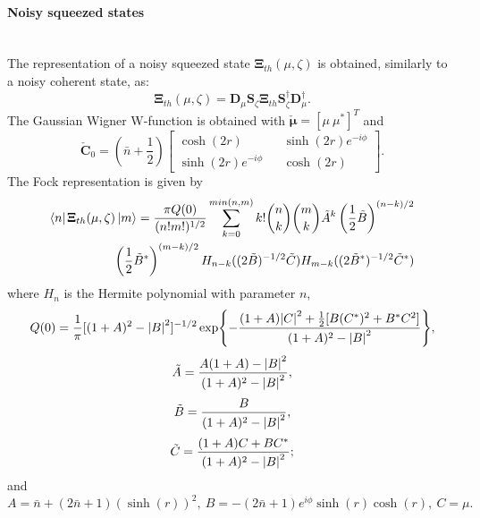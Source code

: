     \paragraph{Noisy squeezed states}\mbox{} \\
    The representation of a noisy squeezed state $\pmb{\Xi}_{th}(\mu,\zeta)$ is obtained,
    similarly to a noisy coherent state, as:
    \begin{equation}
        \pmb{\Xi}_{th}(\mu,\zeta)=\pmb{D}_\mu\pmb{S}_\zeta\pmb{\Xi}_{th}
        \pmb{S}_\zeta^\dagger\pmb{D}_\mu^\dagger.
    \end{equation}
    The Gaussian Wigner W-function is obtained with $\check{\pmb{\mu}}=[\mu\ \mu^*]^T$ and
    \begin{equation*}
        \check{\pmb{C}}_0=\left(\bar{n}+\frac{1}{2}\right)
        \begin{bmatrix}
            \cosh(2r) && \sinh(2r)e^{-i\phi}\\
            \sinh(2r)e^{-i\phi} && \cosh(2r)
        \end{bmatrix}.
    \end{equation*}
    The Fock representation is given by \cite{MarMar_1993}
    \begin{equation}\begin{split}
        \bra{n}\pmb{\Xi}_{th}(\mu,\zeta)\ket{m}=\frac{\pi Q(0)}{(n!m!)^{1/2}}
        \sum_{k=0}^{min(n,m)} k! \binom{n}{k}\binom{m}{k} \tilde{A}^k\left(\frac{1}{2}
        \tilde{B}\right)^{(n-k)/2}\\ \left(\frac{1}{2}\tilde{B}^*\right)^{(m-k)/2}
        H_{n-k}((2\tilde{B})^{-1/2}\tilde{C}) H_{m-k}((2\tilde{B}^*)^{-1/2}\tilde{C}^*) 
        \label{FR_NSS}
    \end{split}\end{equation}
    where $H_n$ is the Hermite polynomial with parameter $n$,
    \begin{equation*}
        Q(0)=\frac{1}{\pi}[(1+A)^2-\absolutevalue{B}^2]^{-1/2}\exp{-\frac{(1+A)\absolutevalue{C}^2
        +\frac{1}{2}[B(C^*)^2+B^*C^2]}{(1+A)^2-\absolutevalue{B}^2}},
    \end{equation*} 
    \begin{equation*}
        \tilde{A}=\frac{A(1+A)-\absolutevalue{B}^2}{(1+A)^2-\absolutevalue{B}^2},
    \end{equation*}
    \begin{equation*}
        \tilde{B}=\frac{B}{(1+A)^2-\absolutevalue{B}^2},
    \end{equation*}
    \begin{equation*}
        \tilde{C}=\frac{(1+A)C+BC^*}{(1+A)^2-\absolutevalue{B}^2};
    \end{equation*}
    and
    \begin{equation*}
        A=\bar{n}+(2\bar{n}+1)(\sinh(r))^2,\ 
        B=-(2\bar{n}+1)e^{i\phi}\sinh(r)\cosh(r),\ 
        C=\mu.
    \end{equation*}

